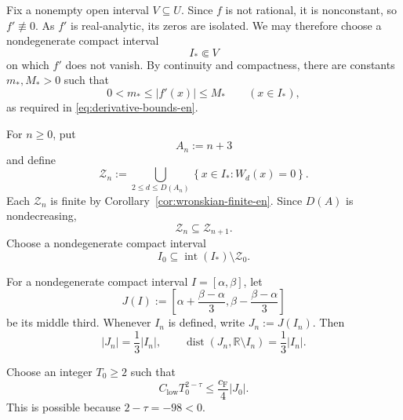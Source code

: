 \documentclass[11pt]{amsart}
\numberwithin{equation}{section}
\theoremstyle{definition}
\theoremstyle{remark}
\newcommand{\R}{\mathbb R}
\newcommand{\dist}{\operatorname{dist}}
\newcommand{\Int}{\operatorname{int}}
\newcommand{\abs}[1]{\left\lvert #1\right\rvert}
\newcommand{\set}[1]{\left\{#1\right\}}
\begin{document}
Fix a nonempty open interval $V\subseteq U$. Since $f$ is not rational, it is nonconstant, so $f'\not\equiv0$. As $f'$ is real-analytic, its zeros are isolated. We may therefore choose a
nondegenerate compact interval
\begin{equation}\label{eq:I-star-choice-en}
I_*\Subset V
\end{equation}
on which $f'$ does not vanish. By continuity and compactness, there are
constants $m_*,M_*>0$ such that
\[
0<m_*\leq\abs{f'(x)}\leq M_*
\qquad(x\in I_*),
\]
as required in \eqref{eq:derivative-bounds-en}.

For $n\geq0$, put
\begin{equation}\label{eq:A-n-en}
A_n:=n+3
\end{equation}
and define
\begin{equation}\label{eq:Z-n-en}
\mathcal Z_n
:=
\bigcup_{2\leq d\leq D(A_n)}
\set{x\in I_*:W_d(x)=0}.
\end{equation}
Each $\mathcal Z_n$ is finite by
Corollary~\ref{cor:wronskian-finite-en}. Since $D(A)$ is nondecreasing,
\begin{equation}\label{eq:Z-n-nested-en}
\mathcal Z_n\subseteq\mathcal Z_{n+1}.
\end{equation}
Choose a nondegenerate compact interval
\begin{equation}\label{eq:I0-en}
I_0\subseteq\Int(I_*)\setminus\mathcal Z_0.
\end{equation}

For a nondegenerate compact interval $I=[\alpha,\beta]$, let
\begin{equation}\label{eq:middle-third-en}
J(I)
:=
\left[
\alpha+\frac{\beta-\alpha}{3},
\beta-\frac{\beta-\alpha}{3}
\right]
\end{equation}
be its middle third. Whenever $I_n$ is defined, write
$J_n:=J(I_n)$. Then
\begin{equation}\label{eq:middle-third-length-en}
|J_n|=\frac13|I_n|,
\qquad
\dist(J_n,\R\setminus I_n)=\frac13|I_n|.
\end{equation}

Choose an integer $T_0\geq2$ such that
\begin{equation}\label{eq:initial-tail-en}
C_{\mathrm{low}}T_0^{2-\tau}
\leq
\frac{c_{\mathrm F}}4|J_0|.
\end{equation}
This is possible because $2-\tau=-98<0$.
\end{document}
